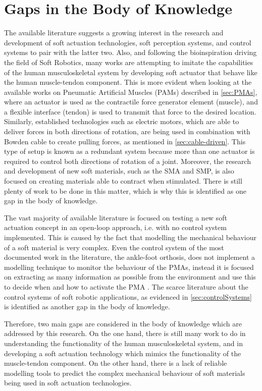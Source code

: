 \section{Gaps in the Body of Knowledge} \label{sec:gaps}

The available literature suggests a growing interest in the research and development of soft actuation technologies, soft perception systems, and control systems to pair with the latter two. Also, and following the bioinspiration driving the field of Soft Robotics, many works are attempting to imitate the capabilities of the human musculoskeletal system by developing soft actuator that behave like the human muscle-tendon component. This is more evident when looking at the available works on Pneumatic Artificial Muscles (PAMs) described in \autoref{sec:PMAs}, where an actuator is used as the contractile force generator element (muscle), and a flexible interface (tendon) is used to transmit that force to the desired location. Similarly, established technologies such as electric motors, which are able to deliver forces in both directions of rotation, are being used in combination with Bowden cable to create pulling forces, as mentioned in \autoref{sec:cable-driven}. This type of setup is known as a redundant system because more than one actuator is required to control both directions of rotation of a joint. Moreover, the research and development of new soft materials, such as the SMA and SMP, is also focused on creating materials able to contract when stimulated. There is still plenty of work to be done in this matter, which is why this is identified as one gap in the body of knowledge.

The vast majority of available literature is focused on testing a new soft actuation concept in an open-loop approach, i.e. with no control system implemented. This is caused by the fact that modelling the mechanical behaviour of a soft material is very complex. Even the control system of the most documented work in the literature, the ankle-foot orthosis, does not implement a modelling technique to monitor the behaviour of the PMAs, instead it is focused on extracting as many information as possible from the environment and use this to decide when and how to activate the PMA \cite{park2011bio}. The scarce literature about the control systems of soft robotic applications, as evidenced in \autoref{sec:controlSystems} is identified as another gap in the body of knowledge.

Therefore, two main gaps are considered in the body of knowledge which are addressed by this research. On the one hand, there is still many work to do in understanding the functionality of the human musculoskeletal system, and in developing a soft actuation technology which mimics the functionality of the muscle-tendon component. On the other hand, there is a lack of reliable modelling tools to predict the complex mechanical behaviour of soft materials being used in soft actuation technologies. 

